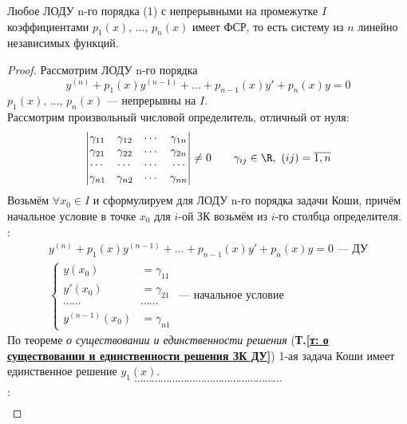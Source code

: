 \newpage
\begin{theorem}
    Любое ЛОДУ n-го порядка (1) с непрерывными на промежутке $I$ коэффициентами $p_1(x),\, \ldots,\, p_n(x)$ имеет ФСР, то есть систему из $n$ линейно независимых функций.
\end{theorem}
\begin{proof}
    Рассмотрим ЛОДУ n-го порядка
    \[
        y^{(n)} + p_1(x)y^{(n-1)} + \ldots + p_{n-1}(x) y' + p_n(x) y = 0
    \]
    $p_1(x),\, \ldots,\, p_n(x)$ --- непрерывны на $I$. \\
    Рассмотрим произвольный числовой определитель, отличный от нуля:
    \[
        \begin{vmatrix}
            \gamma_{11} & \gamma_{12} & \cdots & \gamma_{1n} \\
            \gamma_{21} & \gamma_{22} & \cdots & \gamma_{2n} \\
            \cdots & \cdots & \cdots & \cdots \\
            \gamma_{n1} & \gamma_{n2} & \cdots & \gamma_{nn}
        \end{vmatrix} \ne 0\qquad \gamma_{ij} \in \R,\ (ij) = \overline{1,n}
    \]
    Возьмём $\forall x_0 \in I$ и сформулируем для ЛОДУ n-го порядка задачи Коши, причём начальное условие в точке $x_0$ для $i$-ой ЗК возьмём из $i$-го столбца определителя.\\[1ex]
    : \vspace{-\topsep}
    \begin{gather*}
        y^{(n)} + p_1(x)y^{(n-1)} + \ldots + p_{n-1}(x) y' + p_n(x) y = 0\text{ --- ДУ}\\
        \left\{ \begin{aligned}
            y(x_0) &= \gamma_{11} \\
            y'(x_0) &= \gamma_{21}\\
            \cdots\cdots&\cdots\cdots \\
            y^{(n-1)}(x_0) &= \gamma_{n1} 
        \end{aligned}\right.\text{ --- начальное условие}
    \end{gather*}
    По теореме \textit{о существовании и единственности решения} (\textbf{Т.\ref{т: о существовании и единственности решения ЗК ДУ}}) 1-ая задача Коши имеет единственное решение $y_1(x)$. \\
    \[
        \cdots\cdots\cdots\cdots\cdots\cdots\cdots\cdots\cdots\cdots\cdots\cdots\cdots\cdots\cdots\cdots\cdots
    \]
    :
    \begin{gather*}

\end{gather*}
\end{proof}
